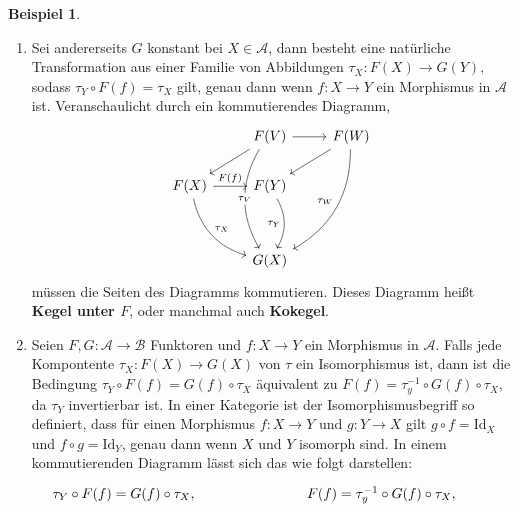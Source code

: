 \documentclass{article}
\theoremstyle{plain}
\theoremstyle{definition}
\newtheorem{exmp}{Beispiel}[section]
\theoremstyle{remark}
\begin{document}
\begin{exmp}
\begin{enumerate}
	\item Sei andererseits $G$ konstant bei $X \in \mathcal{A}$, dann besteht eine natürliche Transformation aus einer Familie von Abbildungen $\tau_X: F(X) \rightarrow G(Y)$, sodass $\tau_Y \circ F(f) = \tau_X$ gilt, genau dann wenn $f: X \rightarrow Y$ ein Morphismus in $\mathcal{A}$ ist. Veranschaulicht durch ein kommutierendes Diagramm,
	\begin{equation}
		\begin{tikzcd}
		                                                         & F(V) \arrow[ld] \arrow[r] \arrow[ddd, "\tau_V" description, bend right, shift right] & F(W) \arrow[ld] \arrow[lddd, "\tau_W"', bend left] \\
		F(X) \arrow[r, "F(f)"] \arrow[rdd, "\tau_X", bend right] & F(Y) \arrow[dd, "\tau_Y"', bend left]                                                &                                                    \\
		                                                         &                                                                                      &                                                    \\
		                                                         & G(X)                                                                                 &                                                   
		\end{tikzcd}
	\end{equation}
	müssen die Seiten des Diagramms kommutieren. Dieses Diagramm heißt \textbf{Kegel unter $F$}, oder manchmal auch \textbf{Kokegel}.
	\item Seien $F,G: \mathcal{A} \rightarrow \mathcal{B}$ Funktoren und $f: X \rightarrow Y$ ein Morphismus in $\mathcal{A}$. Falls jede Kompontente $\tau_X: F(X) \rightarrow G(X)$ von $\tau$ ein Isomorphismus ist, dann ist die Bedingung $\tau_Y \circ F(f) = G(f) \circ \tau_X$ äquivalent zu $F(f) = \tau_y^{-1} \circ G(f) \circ \tau_X$, da $\tau_Y$ invertierbar ist. In einer Kategorie ist der Isomorphismusbegriff so definiert, dass für einen Morphismus $f:X \rightarrow Y$ und $g:Y \rightarrow X$ gilt $g \circ f = \text{Id}_X$ und $f \circ g = \text{Id}_Y$, genau dann wenn $X$ und $Y$ isomorph sind. In einem kommutierenden Diagramm lässt sich das wie folgt darstellen:
	\begin{equation}
		\begin{tikzcd}
		{\tau_Y \circ F(f) = G(f) \circ \tau_X,}   &                          &  & F(f) = \tau_y^{-1} \circ G(f) \circ \tau_X,            &                                \\

\end{tikzcd}
\end{equation}
\end{enumerate}
\end{exmp}
\end{document}
